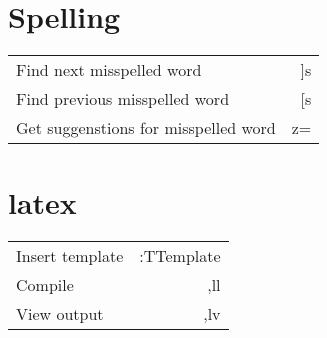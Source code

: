 \documentclass[a4paper]{report}
\begin{document}
\section{Spelling}

\begin{tabular}{| l | r |}
  \hline
  Find next misspelled word & ]s \\
  Find previous misspelled word & [s \\
  Get suggenstions for misspelled word & z= \\
  \hline
\end{tabular}

\section{latex}
\begin{tabular}{| l | r |}
  \hline
  Insert template & :TTemplate \\
  Compile & ,ll \\
  View output & ,lv\\
  \hline
\end{tabular}
\end{document}

